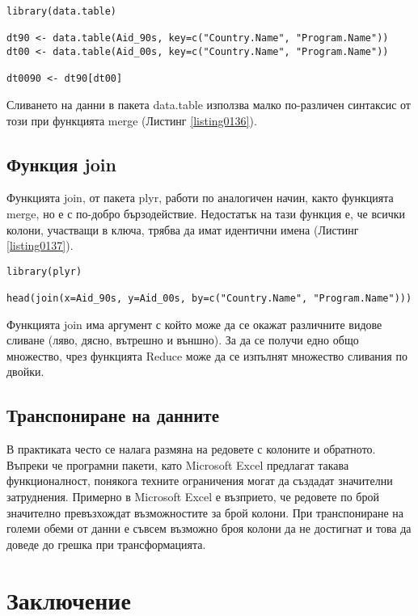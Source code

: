 \begin{lstlisting}[caption=Сливане на данни при data.table, label=listing0136]
library(data.table)

dt90 <- data.table(Aid_90s, key=c("Country.Name", "Program.Name"))
dt00 <- data.table(Aid_00s, key=c("Country.Name", "Program.Name"))

dt0090 <- dt90[dt00]
\end{lstlisting}

Сливането на данни в пакета data.table използва малко по-различен синтаксис от този при функцията merge (Листинг \ref{listing0136}).

\subsection{Функция join}

Функцията join, от пакета plyr, работи по аналогичен начин, както функцията merge, но е с по-добро бързодействие. Недостатък на тази функция е, че всички колони, участващи в ключа, трябва да имат идентични имена (Листинг \ref{listing0137}). 

\begin{lstlisting}[caption=Сливане на данни с join, label=listing0137]
library(plyr)

head(join(x=Aid_90s, y=Aid_00s, by=c("Country.Name", "Program.Name")))
\end{lstlisting}

Функцията join има аргумент с който може да се окажат различните видове сливане (ляво, дясно, вътрешно и външно). За да се получи едно общо множество, чрез функцията Reduce може да се изпълнят множество сливания по двойки. 

\subsection{Транспониране на данните}

В практиката често се налага размяна на редовете с колоните и обратното. Въпреки че програмни пакети, като Microsoft Excel предлагат такава функционалност, понякога техните ограничения могат да създадат значителни затруднения. Примерно в Microsoft Excel е възприето, че редовете по брой значително превъзхождат възможностите за брой колони. При транспониране на големи обеми от данни е съвсем възможно броя колони да не достигнат и това да доведе до грешка при трансформацията. 

\section*{Заключение}

